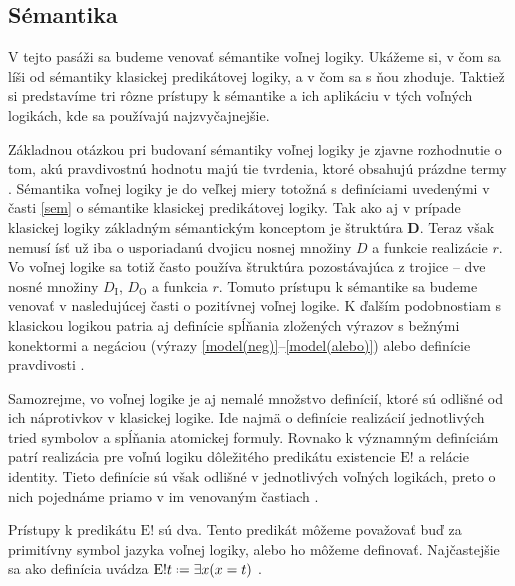 \documentclass[12pt, letterpaper]{article}
\newcommand*{\defeq}{\mathrel{\vcenter{\baselineskip0.5ex \lineskiplimit0pt
                     \hbox{\scriptsize.}\hbox{\scriptsize.}}}%
                     =}
\begin{document}
\subsection{Sémantika}
\label{flsem}
V tejto pasáži sa budeme venovať sémantike voľnej logiky. Ukážeme si, v čom sa líši od sémantiky klasickej predikátovej logiky, a v čom sa s ňou zhoduje. Taktiež si predstavíme tri rôzne prístupy k sémantike a ich aplikáciu v tých voľných logikách, kde sa používajú najzvyčajnejšie.\par

Základnou otázkou pri budovaní sémantiky voľnej logiky je zjavne rozhodnutie o tom, akú pravdivostnú hodnotu majú tie tvrdenia, ktoré obsahujú prázdne termy \parencites[31]{Bencivenga1981}. Sémantika voľnej logiky je do veľkej miery totožná s definíciami uvedenými v časti \ref{sem} o sémantike klasickej predikátovej logiky. Tak ako aj v prípade klasickej logiky základným sémantickým konceptom je štruktúra \textbf{D}. Teraz však nemusí ísť už iba o usporiadanú dvojicu nosnej množiny $D$ a funkcie realizácie $r$. Vo voľnej logike sa totiž často používa štruktúra pozostávajúca z trojice -- dve nosné množiny $D_{\text{I}}$, $D_{\text{O}}$ a funkcia $r$. Tomuto prístupu k sémantike sa budeme venovať v nasledujúcej časti o pozitívnej voľnej logike. K ďalším podobnostiam s klasickou logikou patria aj definície spĺňania zložených výrazov s bežnými konektormi a negáciou (výrazy \ref{model(neg)}--\ref{model(alebo)}) alebo definície pravdivosti \parencites[11]{Morscher2001}[]{sep-logic-free}[290]{Priest_2008}.\par
Samozrejme, vo voľnej logike je aj nemalé množstvo definícií, ktoré sú odlišné od ich náprotivkov v klasickej logike. Ide najmä o definície realizácií jednotlivých tried symbolov a spĺňania atomickej formuly. Rovnako k významným definíciám patrí realizácia pre voľnú logiku dôležitého predikátu existencie $\text{E}!$ a relácie identity. Tieto definície sú však odlišné v jednotlivých voľných logikách, preto o nich pojednáme priamo v im venovaným častiach \parencites[]{sep-logic-free}.\par
Prístupy k predikátu $\text{E}!$ sú dva. Tento predikát môžeme považovať buď za primitívny symbol jazyka voľnej logiky, alebo ho môžeme definovať. Najčastejšie sa ako definícia uvádza $\text{E}!t \defeq \exists x (x = t)$ \parencites[38]{Bencivenga1981}[137]{Bencivenga2002}[23--26]{LambertE!}[]{sep-logic-free}.\par
\end{document}
